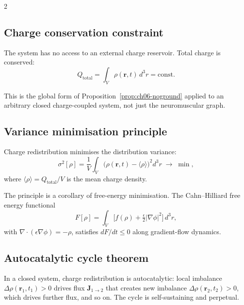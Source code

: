 \begin{multicols}{2}
\subsection{Charge conservation constraint}

\begin{axiom}
\label{ax:ch07-noground}
The system has no access to an external charge reservoir.  Total charge is
conserved:
\begin{equation}
  Q_{\mathrm{total}} = \int_V \rho(\mathbf{r},t)\,d^3r = \mathrm{const.}
  \label{eq:ch07-conservation}
\end{equation}
\end{axiom}

This is the global form of Proposition~\ref{prop:ch06-noground} applied to
an arbitrary closed charge-coupled system, not just the neuromuscular graph.

\subsection{Variance minimisation principle}

\begin{principle}
\label{prin:ch07-variance}
Charge redistribution minimises the distribution variance:
\begin{equation}
  \sigma^2[\rho] = \frac{1}{V}\int_V \bigl(\rho(\mathbf{r},t) - \langle\rho\rangle\bigr)^2 d^3r
  \;\to\; \min,
  \label{eq:ch07-variance}
\end{equation}
where $\langle\rho\rangle = Q_{\mathrm{total}}/V$ is the mean charge density.
\end{principle}

The principle is a corollary of free-energy minimisation.  The
Cahn--Hilliard free energy functional
\begin{equation}
  F[\rho] = \int_V \bigl[f(\rho) + \tfrac{\epsilon}{2}|\nabla\phi|^2\bigr]\,d^3r,
  \label{eq:ch07-free-energy}
\end{equation}
with $\nabla\cdot(\epsilon\nabla\phi) = -\rho$, satisfies $dF/dt \le 0$
along gradient-flow dynamics.

\subsection{Autocatalytic cycle theorem}

\begin{theorem}
\label{thm:ch07-autocatalytic}
In a closed system, charge redistribution is autocatalytic: local imbalance
$\Delta\rho(\mathbf{r}_1,t_1) > 0$ drives flux $\mathbf{J}_{1\to 2}$ that
creates new imbalance $\Delta\rho(\mathbf{r}_2,t_2) > 0$, which drives
further flux, and so on.  The cycle is self-sustaining and perpetual.
\end{theorem}


\end{multicols}
